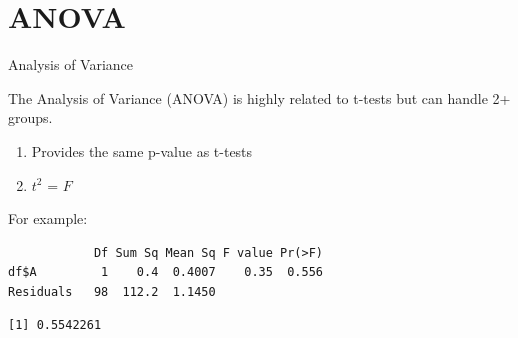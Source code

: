 \section{ANOVA}\label{anova}

\begin{frame}[fragile]{Analysis of Variance}

The Analysis of Variance (ANOVA) is highly related to t-tests but can
handle 2+ groups.

\begin{enumerate}
\def\labelenumi{\arabic{enumi}.}
\tightlist
\item
  Provides the same p-value as t-tests
\item
  \(t^2\) = \(F\)
\end{enumerate}

For example:

\begin{Shaded}
\begin{Highlighting}[]
\StringTok{ }\OperatorTok{$}\OperatorTok{~}\StringTok{ }\OperatorTok{$}
\end{Highlighting}
\end{Shaded}

\begin{verbatim}
            Df Sum Sq Mean Sq F value Pr(>F)
df$A         1    0.4  0.4007    0.35  0.556
Residuals   98  112.2  1.1450               
\end{verbatim}

\begin{Shaded}
\begin{Highlighting}[]
\OperatorTok{$}\OperatorTok{~}\StringTok{ }\OperatorTok{$}\OperatorTok{$}
\end{Highlighting}
\end{Shaded}

\begin{verbatim}
[1] 0.5542261
\end{verbatim}

\end{frame}

